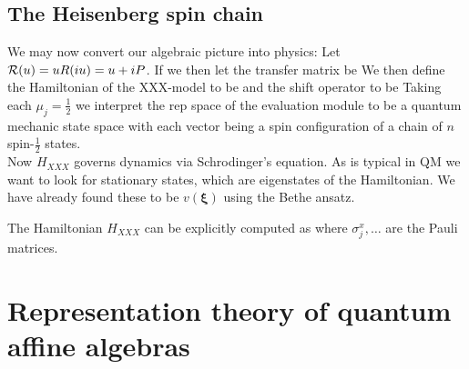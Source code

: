 \documentclass{article}
\begin{document}
\subsection{The Heisenberg spin chain}
We may now convert our algebraic picture into physics: Let $\mathcal{R}(u) = uR(iu) = u + i P$. If we then let the transfer matrix be 
We then define the Hamiltonian of the XXX-model to be 
and the shift operator to be 
Taking each $\mu_j = \frac{1}{2}$ we interpret the rep space of the evaluation module to be a quantum mechanic state space with each vector being a spin configuration of a chain of $n$ spin-$\frac{1}{2}$ states. \\
Now $H_{XXX}$ governs dynamics via Schrodinger's equation. As is typical in QM we want to look for stationary states, which are eigenstates of the Hamiltonian. We have already found these to be $v(\bm{\xi})$ using the Bethe ansatz. 

\begin{lemma}
The Hamiltonian $H_{XXX}$ can be explicitly computed as 
where $\sigma_j^x, \dots$ are the Pauli matrices. 
\end{lemma}


\section{Representation theory of quantum affine algebras}

\end{document}
